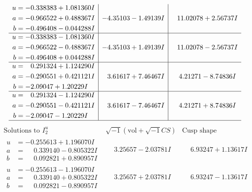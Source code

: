 \documentclass[1p]{elsarticle_modified}
\theoremstyle{definition}
\newcommand{\I}{\sqrt{-1}}
\begin{document}
$$\begin{array}{c|c|c}
\begin{aligned}
u &= -0.338383 + 1.081360 I \\
a &= -0.966522 + 0.488367 I \\
b &= -0.496408 - 0.044288 I\end{aligned}
 & -4.35103 - 1.49139 I & \phantom{-}11.02078 + 2.56737 I \\ \hline\begin{aligned}
u &= -0.338383 - 1.081360 I \\
a &= -0.966522 - 0.488367 I \\
b &= -0.496408 + 0.044288 I\end{aligned}
 & -4.35103 + 1.49139 I & \phantom{-}11.02078 - 2.56737 I \\ \hline\begin{aligned}
u &= \phantom{-}0.291324 + 1.124290 I \\
a &= -0.290551 + 0.421121 I \\
b &= -2.09047 + 1.20229 I\end{aligned}
 & \phantom{-}3.61617 + 7.46467 I & \phantom{-}4.21271 - 8.74836 I \\ \hline\begin{aligned}
u &= \phantom{-}0.291324 - 1.124290 I \\
a &= -0.290551 - 0.421121 I \\
b &= -2.09047 - 1.20229 I\end{aligned}
 & \phantom{-}3.61617 - 7.46467 I & \phantom{-}4.21271 + 8.74836 I\\
 \hline 
 \end{array}$$\newpage$$\begin{array}{c|c|c}  
\text{Solutions to }I^u_{2}& \I (\text{vol} + \sqrt{-1}CS) & \text{Cusp shape}\\
 \hline 
\begin{aligned}
u &= -0.255613 + 1.196070 I \\
a &= \phantom{-}0.339140 - 0.805322 I \\
b &= \phantom{-}0.092821 + 0.890957 I\end{aligned}
 & \phantom{-}3.25657 - 2.03781 I & \phantom{-}6.93247 + 1.13617 I \\ \hline\begin{aligned}
u &= -0.255613 - 1.196070 I \\
a &= \phantom{-}0.339140 + 0.805322 I \\
b &= \phantom{-}0.092821 - 0.890957 I\end{aligned}
 & \phantom{-}3.25657 + 2.03781 I & \phantom{-}6.93247 - 1.13617 I \\ \hline\begin{aligned}

\end{aligned}
\end{array}$$
\end{document}
